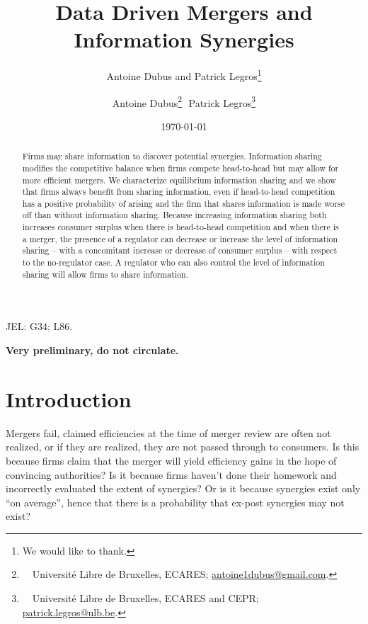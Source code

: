 \documentclass[a4paper,leqno]{article}%
\begin{document}
\title{Data Driven Mergers and Information Synergies}
\author{Antoine Dubus and Patrick Legros\thanks{We would like to thank.}}
\date{\today}

\author{Antoine Dubus\thanks{~~Université Libre de Bruxelles, ECARES; \href{mailto:antoine1dubus@gmail.com}{antoine1dubus@gmail.com}.} $ $
Patrick Legros\thanks{~~Université Libre de Bruxelles, ECARES and CEPR; \href{mailto:patrick.legros@ulb.be}{patrick.legros@ulb.be}.}}

\doublespacing

\maketitle


\begin{abstract}

\noindent Firms may share information to discover potential synergies. Information sharing modifies the competitive balance when firms compete head-to-head but may allow for more efficient mergers. We characterize equilibrium information sharing and we show that firms always benefit from sharing information, even if head-to-head competition has a positive probability of arising and the firm that shares information is made worse off than without information sharing. Because increasing information sharing both increases consumer surplus when there is head-to-head competition and when there is a merger, the presence of a regulator can decrease or increase the level of information sharing -- with a concomitant increase or decrease of consumer surplus -- with respect to the no-regulator case. A regulator who can also control the level of information sharing will allow firms to share information.
\end{abstract} 

JEL: G34; L86.

\textbf{Very preliminary, do not circulate.}

\newpage
\section{Introduction}


Mergers fail, claimed efficiencies at the time of merger review are often not realized, or if they are realized, they are not passed through to consumers. Is this because firms claim that the merger will yield efficiency gains in the hope of convincing authorities? Is it because firms haven't done their homework and incorrectly evaluated the extent of synergies? Or is it because synergies exist only ``on average'', hence that there is a probability that ex-post synergies may not exist?
\end{document}
